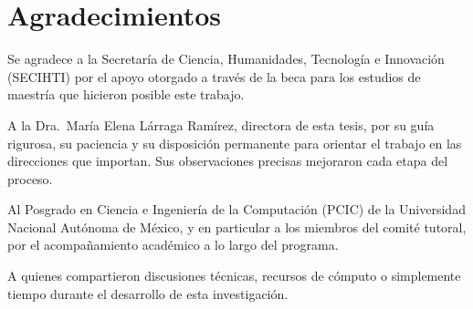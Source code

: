 \chapter*{Agradecimientos}

Se agradece a la Secretaría de Ciencia, Humanidades, Tecnología e Innovación (SECIHTI) por el apoyo otorgado a través de la beca para los estudios de maestría que hicieron posible este trabajo.

A la Dra.\ María Elena Lárraga Ramírez, directora de esta tesis, por su guía rigurosa, su paciencia y su disposición permanente para orientar el trabajo en las direcciones que importan. Sus observaciones precisas mejoraron cada etapa del proceso.

Al Posgrado en Ciencia e Ingeniería de la Computación (PCIC) de la Universidad Nacional Autónoma de México, y en particular a los miembros del comité tutoral, por el acompañamiento académico a lo largo del programa.

A quienes compartieron discusiones técnicas, recursos de cómputo o simplemente tiempo durante el desarrollo de esta investigación.

\cleardoublepage
